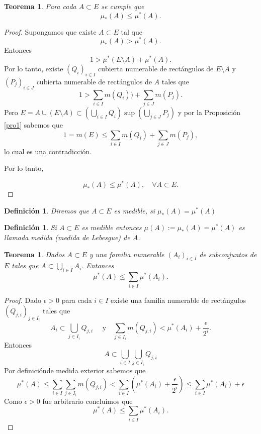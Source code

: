 \documentclass[twoside,12pt,a4 paper,openright]{book}
\newtheorem{teo}[claim]{Teorema}
\newtheorem{defi}[claim]{Definici\'on}
\begin{document}
\begin{teo}
Para cada $A\subset E$ se cumple que
$$ \mu_* (A )\leq   \mu^* ( A ).$$
\end{teo}
\begin{proof}
Supongamos  que existe $A\subset E$ tal que 
$$ \mu_* (A )>  \mu^* ( A ).$$
Entonces 
$$ 1> \mu^* (E\setminus A ) +  \mu^* ( A ).$$
Por  lo tanto, existe  $(Q_i)_{i\in I}$ cubierta numerable  de rect\'angulos de $E\setminus A$  y    $(P_j)_{i\in J}$ cubierta numerable  de rect\'angulos de $ A$  tales que 
$$ 1>  \sum_{i\in I} m(Q_i)) +  \sum_{j\in J} m(P_j).$$
Pero $E =A \cup (E\setminus A ) \subset   ( \bigcup_{i\in I} Q_i ) \sup ( \bigcup_{j\in J} P_j) $ y por la Proposici\'on \ref{pro1} sabemos que 
$$1=m(E) \leq \sum_{i\in I} m(Q_i)  + \sum_{j\in J} m(P_j) ,$$
lo cual es una contradicci\'on. 


Por lo tanto,  
   
$$ \mu_* (A )\leq   \mu^* ( A ), \quad \forall A\subset  E.$$


\end{proof}


\begin{defi}
Diremos que $A\subset E$ es medible, si  $ \mu_* (A )= \mu^* ( A )$ 

\end{defi}




\begin{defi}
Si  $A\subset E$ es medible entonces   $\mu (A):= \mu_* (A )= \mu^* ( A )$ 
 es llamada medida (medida de Lebesgue) de $A$.
\end{defi}




\begin{teo}
\label{teo2}
Dados $A\subset E$ y una familia numerable $(A_i)_{i\in I} $ de subconjuntos de $E$ tales que $A\subset \bigcup_{i\in I} A_i $. Entonces 
$$  \mu^* (A) \leq \sum_{i\in I} \mu^* (  A_i). $$
\end{teo}
\begin{proof}
Dado $\epsilon>0$ para cada $i\in I$ existe una familia numerable de rect\'angulos $(Q_{j,i})_{j\in I_i}$ tales que 
$$ A_i \subset \bigcup _{j\in I_i} Q_{j,i} \quad \textrm{ y} \quad 
\sum_{j\in I_i}m(Q_{j,i}) < \mu^*(A_i) + \frac{\epsilon}{2^i}.
$$
Entonces 
$$A \subset \bigcup_{i\in I} \bigcup_{j\in I_i } Q_{j,i} $$
Por definici\'onde medida exterior sabemos que 
$$\mu^*(A) \leq  \sum_{i\in I} \sum_{j\in I_i }m( Q_{j,i}) < \sum_{i\in I} (  \mu^*(A_i) + \frac{\epsilon}{2^i}) \leq  \sum_{i\in I}   \mu^*(A_i)  + \epsilon   $$
Como $\epsilon >0$ fue arbitrario concluimos que 
$$  \mu^* (A) \leq \sum_{i\in I} \mu^* (  A_i). $$
\end{proof}
\end{document}
